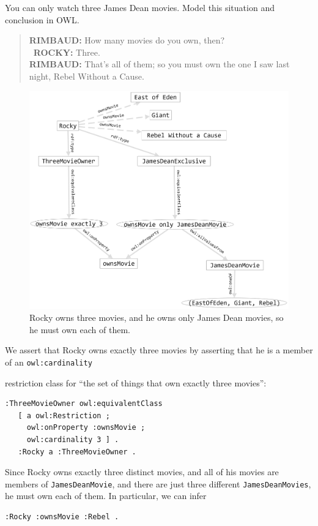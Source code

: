 \begin{challenge}{You can only watch three James Dean movies. } 
\label{chal:34}
Model this situation and conclusion in OWL.

\begin{quote}
\textbf{RIMBAUD:} How many movies do you own, then?  \\\
\textbf{ROCKY:} Three. \\
\textbf{RIMBAUD:} That's all of them; so you must own the one I saw last night, Rebel Without a Cause.\\
\end{quote}

\begin{figure}
\centering
\includegraphics[width=5in]{SWWOv3/media/ch13/figure13-4.png}
\caption{Rocky owns three movies, and he owns only James Dean movies, so he must
own each of them.}
\label{fig:ch13.04}
\end{figure}


\solution

We assert that Rocky owns exactly three movies by asserting that he is a
member of an \texttt{owl:cardinality}

restriction class for ``the set of things that own exactly three movies'':

\begin{lstlisting}
:ThreeMovieOwner owl:equivalentClass
   [ a owl:Restriction ;
     owl:onProperty :ownsMovie ;
     owl:cardinality 3 ] .
   :Rocky a :ThreeMovieOwner .
\end{lstlisting}

Since Rocky owns exactly three distinct movies, and all of his movies
are members of \texttt{JamesDeanMovie}, and there are just three different
\texttt{JamesDeanMovies}, he must own each of them. In particular, we can infer

\begin{lstlisting}
:Rocky :ownsMovie :Rebel .
\end{lstlisting}
\end{challenge}


